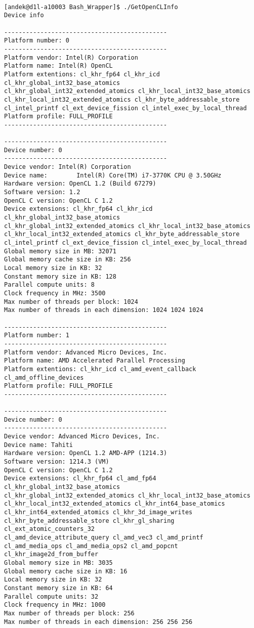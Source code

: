 \begin{verbatim}

[andek@d1l-a10003 Bash_Wrapper]$ ./GetOpenCLInfo 
Device info 
 
---------------------------------------------
Platform number: 0
---------------------------------------------
Platform vendor: Intel(R) Corporation
Platform name: Intel(R) OpenCL
Platform extentions: cl_khr_fp64 cl_khr_icd cl_khr_global_int32_base_atomics 
cl_khr_global_int32_extended_atomics cl_khr_local_int32_base_atomics 
cl_khr_local_int32_extended_atomics cl_khr_byte_addressable_store 
cl_intel_printf cl_ext_device_fission cl_intel_exec_by_local_thread 
Platform profile: FULL_PROFILE
---------------------------------------------

---------------------------------------------
Device number: 0
---------------------------------------------
Device vendor: Intel(R) Corporation
Device name:        Intel(R) Core(TM) i7-3770K CPU @ 3.50GHz
Hardware version: OpenCL 1.2 (Build 67279)
Software version: 1.2
OpenCL C version: OpenCL C 1.2 
Device extensions: cl_khr_fp64 cl_khr_icd cl_khr_global_int32_base_atomics 
cl_khr_global_int32_extended_atomics cl_khr_local_int32_base_atomics 
cl_khr_local_int32_extended_atomics cl_khr_byte_addressable_store 
cl_intel_printf cl_ext_device_fission cl_intel_exec_by_local_thread 
Global memory size in MB: 32071
Global memory cache size in KB: 256
Local memory size in KB: 32
Constant memory size in KB: 128
Parallel compute units: 8
Clock frequency in MHz: 3500
Max number of threads per block: 1024
Max number of threads in each dimension: 1024 1024 1024

---------------------------------------------
Platform number: 1
---------------------------------------------
Platform vendor: Advanced Micro Devices, Inc.
Platform name: AMD Accelerated Parallel Processing
Platform extentions: cl_khr_icd cl_amd_event_callback cl_amd_offline_devices
Platform profile: FULL_PROFILE
---------------------------------------------

---------------------------------------------
Device number: 0
---------------------------------------------
Device vendor: Advanced Micro Devices, Inc.
Device name: Tahiti
Hardware version: OpenCL 1.2 AMD-APP (1214.3)
Software version: 1214.3 (VM)
OpenCL C version: OpenCL C 1.2 
Device extensions: cl_khr_fp64 cl_amd_fp64 cl_khr_global_int32_base_atomics 
cl_khr_global_int32_extended_atomics cl_khr_local_int32_base_atomics 
cl_khr_local_int32_extended_atomics cl_khr_int64_base_atomics 
cl_khr_int64_extended_atomics cl_khr_3d_image_writes 
cl_khr_byte_addressable_store cl_khr_gl_sharing cl_ext_atomic_counters_32 
cl_amd_device_attribute_query cl_amd_vec3 cl_amd_printf 
cl_amd_media_ops cl_amd_media_ops2 cl_amd_popcnt cl_khr_image2d_from_buffer 
Global memory size in MB: 3035
Global memory cache size in KB: 16
Local memory size in KB: 32
Constant memory size in KB: 64
Parallel compute units: 32
Clock frequency in MHz: 1000
Max number of threads per block: 256
Max number of threads in each dimension: 256 256 256


\end{verbatim}
